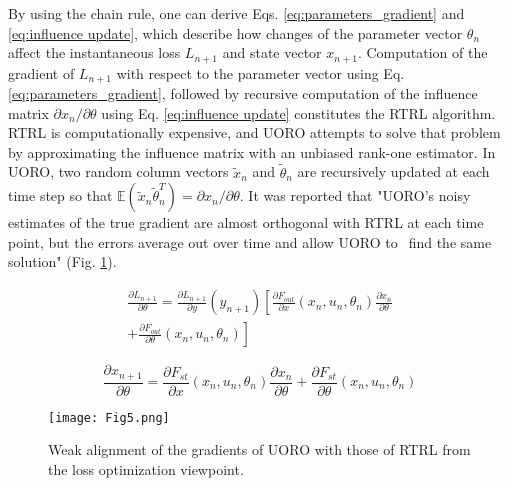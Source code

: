 \documentclass[twocolumn,a4paper]{svjour3} \sloppy          \smartqed
\begin{document}
By using the chain rule, one can derive Eqs. \ref{eq:parameters_gradient} and \ref{eq:influence update}, which describe how changes of the parameter vector $\theta_n$ affect the instantaneous loss $L_{n+1}$ and state vector $x_{n+1}$. Computation of the gradient of $L_{n+1}$ with respect to the parameter vector using Eq. \ref{eq:parameters_gradient}, followed by recursive computation of the influence matrix $\partial{x_n}/ \partial \theta$ using Eq. \ref{eq:influence update} constitutes the RTRL algorithm. RTRL is computationally expensive, and UORO attempts to solve that problem by approximating the influence matrix with an unbiased rank-one estimator. In UORO, two random column vectors $\tilde{x}_n$ and $\tilde{\theta}_n$ are recursively updated at each time step so that $\mathbb{E}(\tilde{x}_n \tilde{\theta}_n^T) = \partial{x_n}/ \partial \theta$. It was reported that "UORO's noisy estimates of the true gradient are almost orthogonal with RTRL at each time point, but the errors average out over time and allow UORO \mbox{to find} the same solution" \cite{marschall2020unified} (Fig. \ref{fig:UORO vs RTRL optimization point of view}).

\begin{multline} \label{eq:parameters_gradient}
\frac{\partial{L_{n+1}}}{\partial \theta} = 
\frac{\partial{L_{n+1}}}{\partial y}(y_{n+1}) 
\left[ \frac{\partial{F_{out}}}{\partial x}(x_n, u_n, \theta_n)
\frac{\partial{x_n}}{\partial \theta} \right. \\
\left. + \frac{\partial{F_{out}}}{\partial \theta}(x_n, u_n, \theta_n) \right]
\end{multline}

\begin{equation} \label{eq:influence update}
\frac{\partial{x_{n+1}}}{\partial \theta} = 
\frac{\partial{F_{st}}}{\partial x}(x_n, u_n, \theta_n) 
\frac{\partial{x_n}}{\partial \theta} + 
\frac{\partial{F_{st}}}{\partial \theta}(x_n, u_n, \theta_n)
\end{equation}

\begin{figure}[thb!]
\centering
\texttt{[image: Fig5.png]}
\caption[Weak alignment of the gradients of UORO with those of RTRL from the loss optimization viewpoint]{Weak alignment of the gradients of UORO with those of RTRL from the loss optimization viewpoint.\protect \footnotemark} \label{fig:UORO vs RTRL optimization point of view}
\end{figure}
\end{document}
